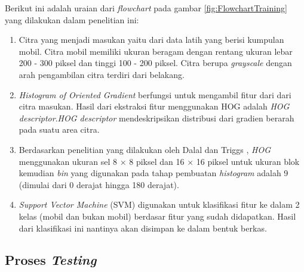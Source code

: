 Berikut ini adalah uraian dari \textit{flowchart} pada gambar \ref{fig:FlowchartTraining} yang dilakukan dalam penelitian ini:
\begin{enumerate}
\item Citra yang menjadi masukan yaitu dari data latih yang berisi kumpulan mobil. Citra mobil memiliki ukuran beragam dengan rentang ukuran lebar 200 - 300 piksel dan tinggi 100 - 200 piksel. Citra berupa \textit{grayscale} dengan arah pengambilan citra terdiri dari belakang.
\item \textit{Histogram of Oriented Gradient} berfungsi untuk mengambil fitur dari dari citra masukan. Hasil dari ekstraksi fitur menggunakan HOG adalah \textit{HOG descriptor}.\textit{HOG descriptor} mendeskripsikan distribusi dari gradien berarah pada suatu area citra.
\item Berdasarkan penelitian yang dilakukan oleh Dalal dan Triggs \cite{dalal}, \textit{HOG} menggunakan ukuran sel 8 $\times$ 8 piksel dan 16 $\times$ 16 piksel untuk ukuran blok kemudian \textit{bin} yang digunakan pada tahap pembuatan \textit{histogram} adalah 9 (dimulai dari 0 derajat hingga 180 derajat).
\item \textit{Support Vector Machine} (SVM) digunakan untuk klasifikasi fitur ke dalam 2 kelas (mobil dan bukan mobil) berdasar fitur yang sudah didapatkan. Hasil dari klasifikasi ini nantinya akan disimpan ke dalam bentuk berkas.\\
\end{enumerate}

\subsection{Proses \textit{Testing}}

\begin{adjustbox}{width=1\textwidth}
	\begin{minipage}{\linewidth}
		\label{fig:FlowchartTesting}
	\end{minipage}
\end{adjustbox}

